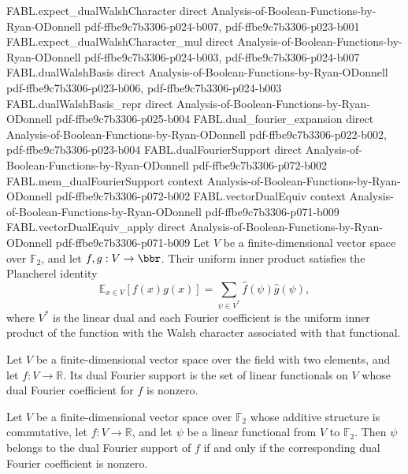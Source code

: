 \begin{theorem}
\proofstep
  {FABL.expect_dualWalshCharacter}
  {direct}
  {Analysis-of-Boolean-Functions-by-Ryan-ODonnell}
  {pdf-ffbe9c7b3306-p024-b007,
    pdf-ffbe9c7b3306-p023-b001}
\proofstep
  {FABL.expect_dualWalshCharacter_mul}
  {direct}
  {Analysis-of-Boolean-Functions-by-Ryan-ODonnell}
  {pdf-ffbe9c7b3306-p024-b003,
    pdf-ffbe9c7b3306-p024-b007}
\proofstep
  {FABL.dualWalshBasis}
  {direct}
  {Analysis-of-Boolean-Functions-by-Ryan-ODonnell}
  {pdf-ffbe9c7b3306-p023-b006,
    pdf-ffbe9c7b3306-p024-b003}
\proofstep
  {FABL.dualWalshBasis_repr}
  {direct}
  {Analysis-of-Boolean-Functions-by-Ryan-ODonnell}
  {pdf-ffbe9c7b3306-p025-b004}
\proofstep
  {FABL.dual_fourier_expansion}
  {direct}
  {Analysis-of-Boolean-Functions-by-Ryan-ODonnell}
  {pdf-ffbe9c7b3306-p022-b002,
    pdf-ffbe9c7b3306-p023-b004}
\proofstep
  {FABL.dualFourierSupport}
  {direct}
  {Analysis-of-Boolean-Functions-by-Ryan-ODonnell}
  {pdf-ffbe9c7b3306-p072-b002}
\proofstep
  {FABL.mem_dualFourierSupport}
  {context}
  {Analysis-of-Boolean-Functions-by-Ryan-ODonnell}
  {pdf-ffbe9c7b3306-p072-b002}
\proofstep
  {FABL.vectorDualEquiv}
  {context}
  {Analysis-of-Boolean-Functions-by-Ryan-ODonnell}
  {pdf-ffbe9c7b3306-p071-b009}
\proofstep
  {FABL.vectorDualEquiv_apply}
  {direct}
  {Analysis-of-Boolean-Functions-by-Ryan-ODonnell}
  {pdf-ffbe9c7b3306-p071-b009}
Let $V$ be a finite-dimensional vector space over $\mathbb{F}_2$, and let
$f,g:V\to\bbr$. Their uniform inner product satisfies the Plancherel identity
\[\mathbb{E}_{x\in V}[f(x)g(x)] = \sum_{\psi\in V^*}\widehat f(\psi)\widehat g(\psi),\]
where $V^*$ is the linear dual and each Fourier coefficient is the uniform inner product
of the function with the Walsh character associated with that functional.
\end{theorem}

\begin{definition}
\label{FABL.dualFourierSupport}
\leanok
{}
Let $V$ be a finite-dimensional vector space over the field with two elements, and let
$f:V\to\mathbb R$. Its dual Fourier support is the set of linear functionals on $V$
whose dual Fourier coefficient for $f$ is nonzero.
\end{definition}

\begin{theorem}
\label{FABL.mem_dualFourierSupport}
\leanok
{}
Let $V$ be a finite-dimensional vector space over $\mathbb{F}_2$ whose additive
structure is commutative, let $f:V\to\mathbb{R}$, and let $\psi$ be a linear functional
from $V$ to $\mathbb{F}_2$. Then $\psi$ belongs to the dual Fourier support of $f$ if
and only if the corresponding dual Fourier coefficient is nonzero.
\end{theorem}

